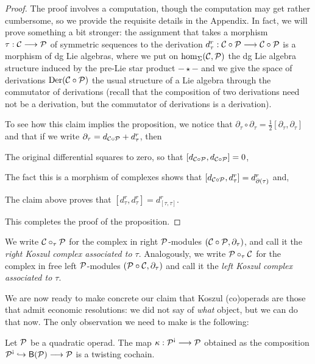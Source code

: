 \begin{proof}
The proof involves a computation, though the computation may get
rather cumbersome, so we provide the requisite
details
in the Appendix. In fact, we will
prove something a bit stronger: the assignment that takes 
a morphism $\tau : \mathcal{C}\longrightarrow {\mathcal{P}}$ of symmetric
sequences to the derivation $d_\tau^r : \mathcal{C}\circ{\mathcal{P}} \longrightarrow
\mathcal{C}\circ {\mathcal{P}}$ is a morphism of dg Lie algebras, where we put
on $\hom_\Sigma(\mathcal{C},{\mathcal{P}})$ the dg Lie algebra structure induced by
the pre-Lie star product $-\star-$ and we give the space of
derivations $\operatorname{Der}(\mathcal{C}\circ{\mathcal{P}})$ the usual
structure of a Lie algebra through the commutator of
derivations (recall that the composition of two derivations
need not be a derivation, but the commutator of derivations
is a derivation).

To see how this claim implies the proposition, we notice
that $\partial_\tau\circ\partial_\tau = \frac{1}{2}[\partial_\tau,\partial_\tau]$
and that if we write $\partial_\tau = d_{\mathcal{C}\circ{\mathcal{P}}} + d_\tau^r$, then
\begin{tenumerate}
\item The original differential squares to zero, so that $[d_{\mathcal{C}\circ{\mathcal{P}}},d_{\mathcal{C}\circ{\mathcal{P}}}] = 0$,
\item The fact this is a morphism of complexes shows that $[d_{\mathcal{C}\circ{\mathcal{P}}},d_\tau^r] = d_{\partial(\tau)}^r$ and,
\item The claim above proves that $[d_\tau^r,d_\tau^r] = d_{[\tau,\tau]}^r$.
\end{tenumerate}
This completes the proof of the proposition.
\end{proof}

\begin{definition}
We write $\mathcal{C}\circ_\tau {\mathcal{P}}$ for the complex in right ${\mathcal{P}}$-modules
$(\mathcal{C}\circ {\mathcal{P}},\partial_\tau)$, and call it the \emph{right Koszul
complex associated to $\tau$}. Analogously, we write ${\mathcal{P}}\circ_\tau \mathcal{C}$
for the complex in free left ${\mathcal{P}}$-modules $({\mathcal{P}}\circ \mathcal{C},\partial_\tau)$
and call it the \emph{left Koszul complex associated to $\tau$}.
\end{definition}

We are now ready to make concrete our claim that Koszul (co)operads are
those that admit economic resolutions: we did not say of \emph{what}
object, but we can do that now. The only observation we need to make
is the following:

\begin{definition}
Let ${\mathcal{P}}$ be a quadratic operad. The map $\kappa : \PP^\antishriek
\longrightarrow \PP$ obtained as the composition
$\PP^\antishriek \hookrightarrow \B{\PP} \longrightarrow \PP$
is a twisting cochain.
\end{definition} 

